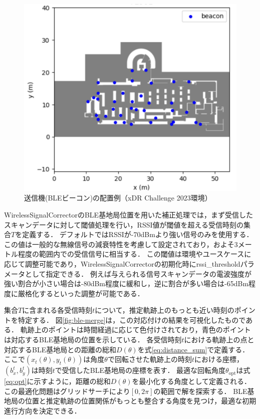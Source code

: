 \begin{figure}[H]
    \centering
    \includegraphics[width=\linewidth]{../image/ble-beacon-position.jpg}
    \caption{送信機(BLEビーコン)の配置例（xDR Challenge 2023環境）}    \label{fig:ble-beacon-position}
\end{figure}


WirelessSignalCorrectorのBLE基地局位置を用いた補正処理では，まず受信したスキャンデータに対して閾値処理を行い，RSSI値が閾値を超える受信時刻の集合$T$を定義する．
デフォルトではRSSIが-70dBmより強い信号のみを使用する．この値は一般的な無線信号の減衰特性を考慮して設定されており，およそ3メートル程度の範囲内での受信信号に相当する．
この閾値は環境やユースケースに応じて調整可能であり，WirelessSignalCorrectorの初期化時にrssi\_thresholdパラメータとして指定できる．
例えば与えられる信号スキャンデータの電波強度が強い割合が小さい場合は-80dBm程度に緩和し，逆に割合が多い場合は-65dBm程度に厳格化するといった調整が可能である．

集合$T$に含まれる各受信時刻$t$について，推定軌跡上のもっとも近い時刻のポイントを特定する．
図\ref{fig:ble-merge}は，この対応付けの結果を可視化したものである．
軌跡上のポイントは時間経過に応じて色付けされており，青色のポイントは対応するBLE基地局の位置を示している．
各受信時刻$t$における軌跡上の点と対応するBLE基地局との距離の総和$D(\theta)$を式\eqref{eq:distance_sum}で定義する．
ここで$(x_t(\theta), y_t(\theta))$は角度$\theta$で回転させた軌跡上の時刻$t$における座標，$(b_x^t, b_y^t)$は時刻$t$で受信したBLE基地局の座標を表す．
最適な回転角度$\theta_{\mathrm{opt}}$は式\eqref{eq:opt}に示すように，距離の総和$D(\theta)$を最小化する角度として定義される．この最適化問題はグリッドサーチにより$[0, 2\pi]$の範囲で解を探索する．
BLE基地局の位置と推定軌跡の位置関係がもっとも整合する角度を見つけ，最適な初期進行方向を決定できる．

